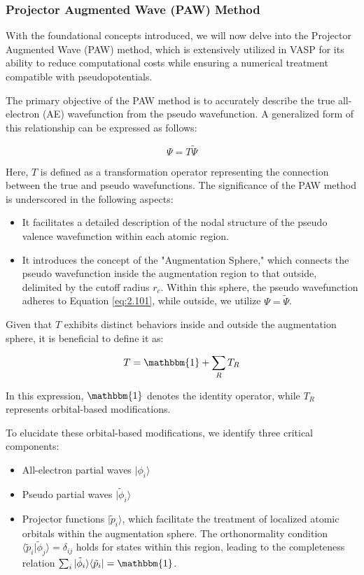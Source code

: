\subsubsection{Projector Augmented Wave (PAW) Method}  
With the foundational concepts introduced, we will now delve into the Projector Augmented Wave (PAW) method, which is extensively utilized in VASP for its ability to reduce computational costs while ensuring a numerical treatment compatible with pseudopotentials.  

The primary objective of the PAW method is to accurately describe the true all-electron (AE) wavefunction from the pseudo wavefunction. A generalized form of this relationship can be expressed as follows:  

\begin{equation}  
	\Psi = T \tilde{\Psi}  
	\label{eq:2.101}  
\end{equation}  

Here, \(T\) is defined as a transformation operator representing the connection between the true and pseudo wavefunctions. The significance of the PAW method is underscored in the following aspects:  

\begin{itemize}  
	\item It facilitates a detailed description of the nodal structure of the pseudo valence wavefunction within each atomic region.  
	\item It introduces the concept of the "Augmentation Sphere," which connects the pseudo wavefunction inside the augmentation region to that outside, delimited by the cutoff radius \(r_c\). Within this sphere, the pseudo wavefunction adheres to Equation \ref{eq:2.101}, while outside, we utilize \(\Psi = \tilde{\Psi}\).  
\end{itemize}  

Given that \(T\) exhibits distinct behaviors inside and outside the augmentation sphere, it is beneficial to define it as:  

\begin{equation}  
	T = \mathbbm{1} + \sum_{R} T_{R}  
	\label{eq:2.102}  
\end{equation}  

In this expression, \(\mathbbm{1}\) denotes the identity operator, while \(T_{R}\) represents orbital-based modifications.  

To elucidate these orbital-based modifications, we identify three critical components:  

\begin{itemize}  
	\item All-electron partial waves \( |\phi_{i} \rangle \)  
	\item Pseudo partial waves \( |\tilde{\phi}_{i} \rangle \)  
	\item Projector functions \( | \tilde{p}_{i} \rangle \), which facilitate the treatment of localized atomic orbitals within the augmentation sphere. The orthonormality condition \( \langle \tilde{p}_i | \tilde{\phi}_j \rangle = \delta_{ij} \) holds for states within this region, leading to the completeness relation \( \sum_{i} | \tilde{\phi}_{i} \rangle \langle \tilde{p}_i | = \mathbbm{1} \).  
\end{itemize}  

